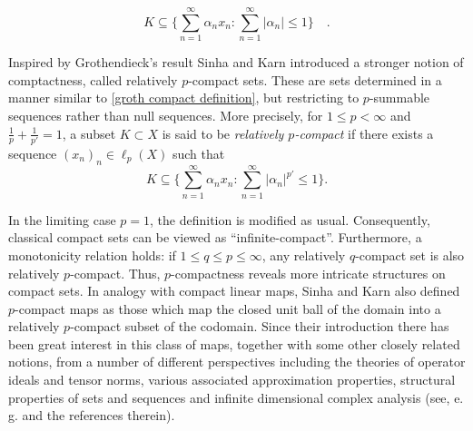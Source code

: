 \documentclass[11pt]{amsart}
\numberwithin{equation}{section}
\begin{document}
\begin{equation}\label{groth compact definition}
K\subseteq \bigg\{\sum_{n=1}^{\infty} \alpha_n x_n \colon \sum_{n=1}^{\infty} \lvert \alpha_n \rvert \leq 1\bigg\} \quad.
\end{equation}

Inspired by Grothendieck's result Sinha and Karn \cite{Sinha-Karn} introduced a stronger notion of comptactness, called relatively \(p\)-compact sets. These are sets determined in a manner similar to \eqref{groth compact definition}, but restricting to  \(p\)-summable sequences rather than null sequences. More precisely, for \(1 \leq p < \infty\) and \(\frac{1}{p} + \frac{1}{p'} = 1\), a subset \(K \subset X\) is said to be \emph{relatively \(p\)-compact} if there exists a sequence $(x_n)_n \in \ell_p(X)$ such that
\begin{equation}\label{p-compact}
K\subseteq \bigg\{\sum_{n=1}^{\infty} \alpha_n x_n \colon \sum_{n=1}^{\infty} \lvert \alpha_n \rvert^{p'} \leq 1\bigg\}.
\end{equation}

In the limiting case \(p = 1\), the definition is modified as usual. Consequently, classical compact sets can be viewed as ``infinite-compact''. Furthermore, a monotonicity relation holds: if \(1 \leq q \leq p \leq \infty\), any relatively \(q\)-compact set is also relatively \(p\)-compact. Thus, \(p\)-compactness reveals more intricate structures on compact sets.
In analogy with compact linear maps, Sinha and Karn \cite{Sinha-Karn} also defined $p$-compact maps as those which map the closed unit ball of the domain into a relatively $p$-compact subset of the codomain.
Since their introduction there has been great interest in this class of maps, together with some other closely related notions, from a number of different perspectives including
the theories of operator ideals and tensor norms,   various associated approximation properties, structural properties of sets and sequences and  infinite dimensional complex analysis (see, e. g. \cite{MR2651671,Choi-Kim,MR2967309, Galicer-Lassalle-Turco, MR3091821, Pietsch-p-compact, MR3394623, Aron-Caliskan-Garcia-Maestre, MR3720927} and the references therein).
\end{document}
